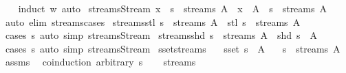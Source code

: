 \begin{isabellebody}
%
\isadelimproof
\ \ %
\endisadelimproof
%
\isatagproof
{}\isamarkupfalse%
\ {\isacharparenleft}induct\ w{\isacharparenright}\ auto%
\endisatagproof
{\isafoldproof}%
%
\isadelimproof
\isanewline
%
\endisadelimproof
\isanewline
{}\isamarkupfalse%
\ streams{\isacharunderscore}Stream{\isacharcolon}\ {\isachardoublequoteopen}x\ {\isacharhash}{\isacharhash}\ s\ {\isasymin}\ streams\ A\ {\isasymlongleftrightarrow}\ x\ {\isasymin}\ A\ {\isasymand}\ s\ {\isasymin}\ streams\ A{\isachardoublequoteclose}\isanewline
%
\isadelimproof
\ \ %
\endisadelimproof
%
\isatagproof
{}\isamarkupfalse%
\ {\isacharparenleft}auto\ elim{\isacharcolon}\ streams{\isachardot}cases{\isacharparenright}%
\endisatagproof
{\isafoldproof}%
%
\isadelimproof
\isanewline
%
\endisadelimproof
\isanewline
{}\isamarkupfalse%
\ streams{\isacharunderscore}stl{\isacharcolon}\ {\isachardoublequoteopen}s\ {\isasymin}\ streams\ A\ {\isasymLongrightarrow}\ stl\ s\ {\isasymin}\ streams\ A{\isachardoublequoteclose}\isanewline
%
\isadelimproof
\ \ %
\endisadelimproof
%
\isatagproof
{}\isamarkupfalse%
\ {\isacharparenleft}cases\ s{\isacharparenright}\ {\isacharparenleft}auto\ simp{\isacharcolon}\ streams{\isacharunderscore}Stream{\isacharparenright}%
\endisatagproof
{\isafoldproof}%
%
\isadelimproof
\isanewline
%
\endisadelimproof
\isanewline
{}\isamarkupfalse%
\ streams{\isacharunderscore}shd{\isacharcolon}\ {\isachardoublequoteopen}s\ {\isasymin}\ streams\ A\ {\isasymLongrightarrow}\ shd\ s\ {\isasymin}\ A{\isachardoublequoteclose}\isanewline
%
\isadelimproof
\ \ %
\endisadelimproof
%
\isatagproof
{}\isamarkupfalse%
\ {\isacharparenleft}cases\ s{\isacharparenright}\ {\isacharparenleft}auto\ simp{\isacharcolon}\ streams{\isacharunderscore}Stream{\isacharparenright}%
\endisatagproof
{\isafoldproof}%
%
\isadelimproof
\isanewline
%
\endisadelimproof
\isanewline
{}\isamarkupfalse%
\ sset{\isacharunderscore}streams{\isacharcolon}\isanewline
\ \ \ {\isachardoublequoteopen}sset\ s\ {\isasymsubseteq}\ A{\isachardoublequoteclose}\isanewline
\ \ \ {\isachardoublequoteopen}s\ {\isasymin}\ streams\ A{\isachardoublequoteclose}\isanewline
%
\isadelimproof
%
\endisadelimproof
%
\isatagproof
{}\isamarkupfalse%
\ assms\ \isamarkupfalse%
\ {\isacharparenleft}coinduction\ arbitrary{\isacharcolon}\ s{\isacharparenright}\isanewline
\ \ \isamarkupfalse%
\ streams\ \isamarkupfalse%
\ \isamarkupfalse%

\end{isabellebody}
